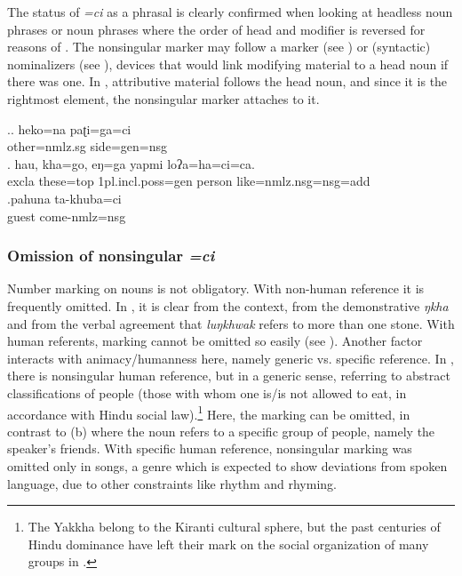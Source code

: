 The status of \emph{=ci} as a phrasal  is clearly confirmed when looking at headless noun phrases or noun phrases where the order of head and modifier is reversed for reasons  of . The nonsingular marker may follow a  marker (see \Next[a]) or (syntactic) nominalizers (see \Next[b]), devices that would link modifying material to a head noun if there was one. In \Next[c], attributive material follows the head noun, and since it is the rightmost element, the nonsingular marker attaches to it.

\ex.\ag. heko=na         paʈi=ga=ci\\
other{\sc =nmlz.sg} side{\sc =gen=nsg}\\
  
\bg. hau,  kha=go,      eŋ=ga              yapmi  loʔa=ha=ci=ca.\\
  {\sc excla} these{\sc =top} {\sc 1pl.incl.poss=gen} person like{\sc =nmlz.nsg=nsg=add}\\
    
 \bg.pahuna ta-khuba=ci\\
guest come{\sc -nmlz=nsg}\\
  
 
\subsubsection{Omission of nonsingular \emph{=ci}}\label{number-1}

Number marking on nouns is not obligatory. With non-human  reference it is frequently omitted.  In \Next[a], it is clear from the context, from the demonstrative \emph{ŋkha} and from the verbal agreement that \emph{luŋkhwak} refers to more than one stone. With human referents,  marking cannot be omitted so easily (see \Next[b]). Another factor interacts with animacy/humanness here, namely generic vs. specific reference. In \Next[c], there is nonsingular human reference, but in a generic sense, referring to abstract classifications of people (those with whom one is/is not allowed to eat, in accordance with Hindu social law).\footnote{The Yakkha belong to the Kiranti cultural sphere, but the past centuries of Hindu dominance have left their mark on the social organization of many  groups in .} Here, the  marking can be omitted, in contrast to  (b) where the noun refers to a specific group of people, namely the speaker's friends. With specific human reference, nonsingular marking was omitted only in songs, a genre which is expected to show deviations from spoken language, due to other constraints like rhythm and rhyming.


